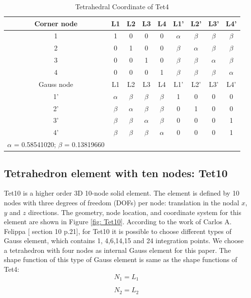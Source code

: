 \begin{table}
	\centering
	\caption{Tetrahedral Coordinate of Tet4} \label{tab: Tet4}
	\begin{tabular}{ccccccccc}			
		\hline
		Corner node\centering& L1& L2& L3& L4& L1'& L2'& L3'& L4'\\ \hline
		1\centering& 1& 0& 0& 0& $\alpha$& $\beta$& $\beta$& $\beta$\\
		2\centering& 0& 1& 0& 0& $\beta$& $\alpha$& $\beta$& $\beta$\\
		3\centering& 0& 0& 1& 0& $\beta$& $\beta$& $\alpha$& $\beta$\\
		4\centering& 0& 0& 0& 1& $\beta$& $\beta$& $\beta$& $\alpha$\\
		\hline
		Gauss node\centering& L1& L2& L3& L4& L1'& L2'& L3'& L4' \\ \hline
		1'\centering& $\alpha$& $\beta$& $\beta$& $\beta$& 1& 0& 0& 0  \\
		2'\centering&$\beta$ & $\alpha$& $\beta$& $\beta$& 0& 1& 0& 0 \\
		3'\centering& $\beta$& $\beta$& $\alpha$& $\beta$& 0& 0& 0& 1\\
		4'\centering& $\beta$& $\beta$& $\beta$& $\alpha$& 0& 0& 0& 1\\
		\hline
		$\alpha$ = 0.58541020; $\beta$ = 0.13819660&&&&&&&&\\
		\hline 		    
	\end{tabular}	
\end{table}		

\subsection{Tetrahedron element with ten nodes: Tet10}
Tet10 is a higher order 3D 10-node solid element. The element is defined by 10 nodes with three degrees of freedom (DOFs) per node: translation in the nodal $x$, $y$ and $z$ directions. The geometry, node location, and coordinate system for this element are shown in Figure \ref{fig: Tet10}. According to the work of Carlos A. Felippa [\cite{Felippa} section 10 p.21], for Tet10 it is possible to choose different types of Gauss element, which contains 1, 4,6,14,15 and 24 integration points. We choose a tetrahedron with four nodes as internal Gauss element for this paper. The shape function of this type of Gauss element is same as the shape functions of Tet4:
\begin{equation}
N_1 = L_1
\end{equation}

\begin{equation}
N_2 = L_2
\end{equation}

